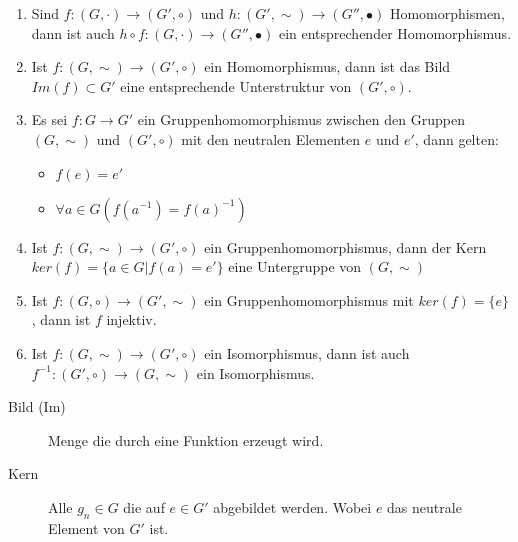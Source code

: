 \begin{enumerate}
	\item Sind $f: (G, \cdot) \rightarrow (G', \circ)$ und $h: (G', \sim) \rightarrow (G'', \bullet)$ Homomorphismen, dann ist auch $h \circ f: (G, \cdot) \rightarrow (G'', \bullet)$ ein entsprechender Homomorphismus.
	\item Ist $f: (G, \sim) \rightarrow (G', \circ)$ ein Homomorphismus, dann ist das Bild $Im(f) \subset G'$ eine entsprechende Unterstruktur von $(G', \circ).$
	\item Es sei $f: G \rightarrow G'$ ein Gruppenhomomorphismus zwischen den Gruppen $(G, \sim)$ und $(G', \circ)$ mit den neutralen Elementen $e$ und $e'$, dann gelten:
	\begin{itemize}
		\item $f(e) = e'$
		\item $\forall a \in G(f(a^{-1}) = f(a)^{-1})$
	\end{itemize}
	\item Ist $f: (G, \sim) \rightarrow (G', \circ)$ ein Gruppenhomomorphismus, dann der Kern $ker(f) = \{a \in G | f(a) = e'\}$ eine Untergruppe von $(G, \sim)$
	\item Ist $f: (G, \circ) \rightarrow (G', \sim)$ ein Gruppenhomomorphismus mit $ker(f) = \{e\}$,
	dann ist $f$ injektiv.
	\item Ist $f: (G, \sim) \rightarrow (G', \circ)$ ein Isomorphismus, dann ist auch $f^{-1}: (G', \circ) \rightarrow (G, \sim)$ ein Isomorphismus.
\end{enumerate}

\begin{description}
	\item [Bild (Im)] Menge die durch eine Funktion erzeugt wird.
	\item [Kern] Alle $g_n \in G$ die auf $e \in G'$ abgebildet werden. Wobei $e$ das neutrale Element von $G'$ ist.
\end{description}
